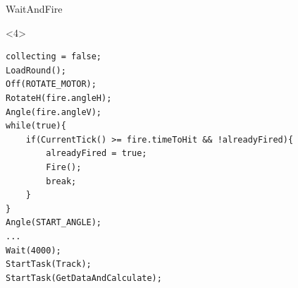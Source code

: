 \begin{frame}[fragile]{WaitAndFire}
\begin{onlyenv}<4>
\begin{center}
\begin{minipage}[H]{0.9\linewidth}
\begin{lstlisting}
collecting = false;
LoadRound();
Off(ROTATE_MOTOR);
RotateH(fire.angleH);
Angle(fire.angleV);
while(true){
	if(CurrentTick() >= fire.timeToHit && !alreadyFired){
    	alreadyFired = true;
        Fire();
        break;
    }
}
Angle(START_ANGLE);
...
Wait(4000);
StartTask(Track);
StartTask(GetDataAndCalculate);
\end{lstlisting} 
\end{minipage}
\end{center}
\end{onlyenv}
\end{frame}


